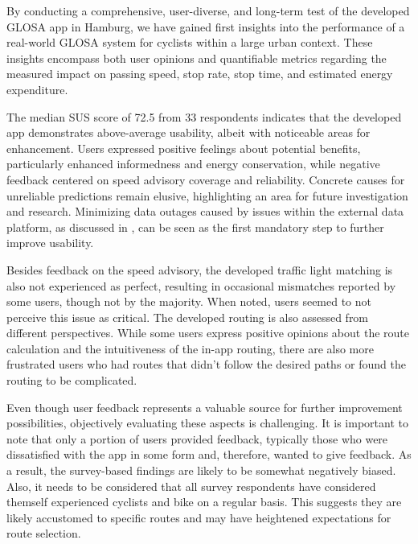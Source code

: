 \begin{Summary}
By conducting a comprehensive, user-diverse, and long-term test of the developed GLOSA app in Hamburg, we have gained first insights into the performance of a real-world GLOSA system for cyclists within a large urban context. These insights encompass both user opinions and quantifiable metrics regarding the measured impact on passing speed, stop rate, stop time, and estimated energy expenditure.

The median SUS score of 72.5 from 33 respondents indicates that the developed app demonstrates above-average usability, albeit with noticeable areas for enhancement. Users expressed positive feelings about potential benefits, particularly enhanced informedness and energy conservation, while negative feedback centered on speed advisory coverage and reliability. Concrete causes for unreliable predictions remain elusive, highlighting an area for future investigation and research. Minimizing data outages caused by issues within the external data platform, as discussed in , can be seen as the first mandatory step to further improve usability. 

Besides feedback on the speed advisory, the developed traffic light matching is also not experienced as perfect, resulting in occasional mismatches reported by some users, though not by the majority. When noted, users seemed to not perceive this issue as critical. The developed routing is also assessed from different perspectives. While some users express positive opinions about the route calculation and the intuitiveness of the in-app routing, there are also more frustrated users who had routes that didn't follow the desired paths or found the routing to be complicated. 

Even though user feedback represents a valuable source for further improvement possibilities, objectively evaluating these aspects is challenging. It is important to note that only a portion of users provided feedback, typically those who were dissatisfied with the app in some form and, therefore, wanted to give feedback. As a result, the survey-based findings are likely to be somewhat negatively biased. Also, it needs to be considered that all survey respondents have considered themself experienced cyclists and bike on a regular basis. This suggests they are likely accustomed to specific routes and may have heightened expectations for route selection.


\end{Summary}
